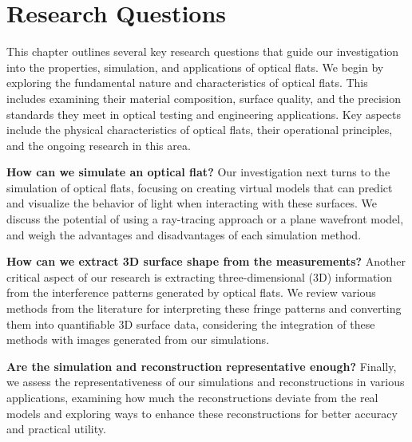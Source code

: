 \documentclass[../main.tex]{subfiles}
\begin{document}
\chapter{Research Questions}
This chapter outlines several key research questions that guide our investigation into the properties, simulation, and applications of optical flats. We begin by exploring the fundamental nature and characteristics of optical flats. This includes examining their material composition, surface quality, and the precision standards they meet in optical testing and engineering applications. Key aspects include the physical characteristics of optical flats, their operational principles, and the ongoing research in this area.

\textbf{How can we simulate an optical flat?} Our investigation next turns to the simulation of optical flats, focusing on creating virtual models that can predict and visualize the behavior of light when interacting with these surfaces. We discuss the potential of using a ray-tracing approach or a plane wavefront model, and weigh the advantages and disadvantages of each simulation method.

\textbf{How can we extract 3D surface shape from the measurements?} Another critical aspect of our research is extracting three-dimensional (3D) information from the interference patterns generated by optical flats. We review various methods from the literature for interpreting these fringe patterns and converting them into quantifiable 3D surface data, considering the integration of these methods with images generated from our simulations.

\textbf{Are the simulation and reconstruction representative enough?} Finally, we assess the representativeness of our simulations and reconstructions in various applications, examining how much the reconstructions deviate from the real models and exploring ways to enhance these reconstructions for better accuracy and practical utility.
\end{document}
